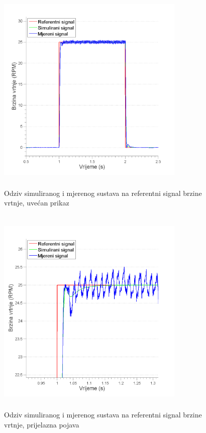 \documentclass[12pt,a4paper]{article}
\begin{document}
\begin{figure}[!ht]
	\begin{center}
	\includegraphics[width=0.8\textwidth, height=4in]{Odziv_6x_halfclose.png}
    \caption{Odziv simuliranog i mjerenog sustava na referentni signal brzine vrtnje, uvećan prikaz}
    \end{center}
\end{figure}

\begin{figure}[!hb]
	\begin{center}
	\includegraphics[width=0.8\textwidth, height=4in]{Odziv_6x_close_2.png}
    \caption{Odziv simuliranog i mjerenog sustava na referentni signal brzine vrtnje, prijelazna pojava}
    \end{center}
\end{figure}
\end{document}
